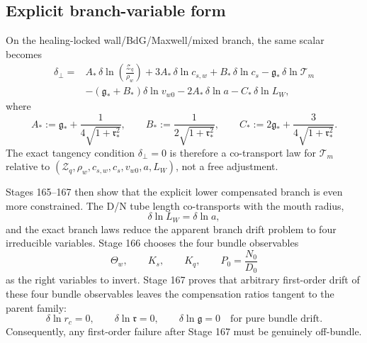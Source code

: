 \subsection{Explicit branch-variable form}
On the healing-locked wall/BdG/Maxwell/mixed branch, the same scalar becomes
\begin{equation}
\label{eq:part05-delta-perp-explicit}
\begin{aligned}
\delta_\perp={}&
A_*\,\delta\ln\!\left(\frac{\mathcal Z_q}{\rho_w}\right)
+3A_*\,\delta\ln c_{s,w}
+B_*\,\delta\ln c_s
-\mathfrak g_*\,\delta\ln\mathcal T_m \\
&-(\mathfrak g_*+B_*)\delta\ln v_{w0}
-2A_*\,\delta\ln a
-C_*\,\delta\ln L_W,
\end{aligned}
\end{equation}
where
\begin{equation}
\label{eq:part05-ABC-defs}
A_*:=\mathfrak g_*+\frac{1}{4\sqrt{1+\mathfrak r_*^2}},
\qquad
B_*:=\frac{1}{2\sqrt{1+\mathfrak r_*^2}},
\qquad
C_*:=2\mathfrak g_*+\frac{3}{4\sqrt{1+\mathfrak r_*^2}}.
\end{equation}
The exact tangency condition \(\delta_\perp=0\) is therefore a co-transport law for \(\mathcal T_m\) relative to
\(
(\mathcal Z_q,\allowbreak \rho_w,\allowbreak c_{s,w},\allowbreak c_s,\allowbreak v_{w0},\allowbreak a,\allowbreak L_W)
\),
not a free adjustment.

Stages 165--167 then show that the explicit lower compensated branch is even more constrained.  The D/N tube length co-transports with the mouth radius,
\begin{equation}
\label{eq:part05-LW-co-transport}
\delta\ln L_W=\delta\ln a,
\end{equation}
and the exact branch laws reduce the apparent branch drift problem to four irreducible variables.  Stage 166 chooses the four bundle observables
\begin{equation}
\label{eq:part05-bundle-observables}
\Theta_w,
\qquad
K_s,
\qquad
K_q,
\qquad
P_0=\frac{N_0}{D_0}
\end{equation}
as the right variables to invert.  Stage 167 proves that arbitrary first-order drift of these four bundle observables leaves the compensation ratios tangent to the parent family:
\begin{equation}
\label{eq:part05-tangent-parent-family}
\delta\ln r_c=0,
\qquad
\delta\ln\mathfrak r=0,
\qquad
\delta\ln\mathfrak g=0
\quad
\text{for pure bundle drift.}
\end{equation}
Consequently, any first-order failure after Stage 167 must be genuinely off-bundle.

